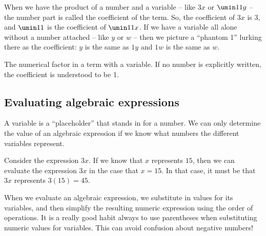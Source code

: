 When we have the product of a number and a variable -- like $3x$ or $\umin11g$ -- the number part is called the \gls{coefficient} of the term. So, the coefficient of $3x$ is 3, and $\umin11$ is the coefficient of $\umin11x$. If we have a variable all alone without a number attached -- like $y$ or $w$ -- then we picture a ``phantom 1'' lurking there as the coefficient: $y$ is the same as $1y$ and $1w$ is the same as $w$.

\begin{boxeddef}[Coefficient]
The numerical factor in a term with a variable. If no number is explicitly written, the coefficient is understood to be 1.
\end{boxeddef}

\subsection{Evaluating algebraic expressions}

A variable is a ``placeholder'' that stands in for a number. We can only determine the value of an algebraic expression if we know what numbers the different variables represent.

Consider the expression $3x$. If we know that $x$ represents $15$, then we can \gls{evaluate} the expression $3x$ in the case that $x = 15$. In that case, it must be that $3x$ represents $3(15) = 45$.

When we evaluate an algebraic expression, we substitute in values for its variables, and then simplify the resulting numeric expression using the order of operations. It is a really good habit always to use parentheses when substituting numeric values for variables. This can avoid confusion about negative numbers!

